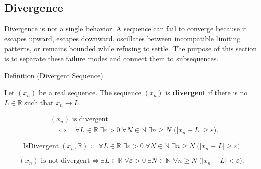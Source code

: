 \subsection*{Divergence}
\begin{exposition}
Divergence is not a single behavior. A sequence can fail to converge because
it escapes upward, escapes downward, oscillates between incompatible limiting
patterns, or remains bounded while refusing to settle. The purpose of this
section is to separate these failure modes and connect them to subsequences.
\end{exposition}


\begin{definitionbox}{Definition (Divergent Sequence)}
\begin{definition}
\label{def:divergent-sequence}
Let $(x_n)$ be a real sequence. The sequence $(x_n)$ is
\textbf{divergent} if there is no $L\in\mathbb{R}$ such that
$x_n\to L$.
\end{definition}
\end{definitionbox}

\begin{remark*}
\[
\begin{aligned}
&(x_n)\text{ is divergent}\\
&\quad\Longleftrightarrow\quad
\forall L\in\mathbb{R}\;\exists \varepsilon>0\;\forall N\in\mathbb{N}
\;\exists n\ge N\;\bigl(|x_n-L|\ge\varepsilon\bigr).
\end{aligned}
\]
\end{remark*}

\begin{remark*}
\[
\operatorname{IsDivergent}(x_n,\mathbb{R})
\coloneqq
\forall L\in\mathbb{R}\;\exists \varepsilon>0\;\forall N\in\mathbb{N}
\;\exists n\ge N\;\bigl(|x_n-L|\ge\varepsilon\bigr).
\]
\end{remark*}

\begin{remark*}
\[
(x_n)\text{ is not divergent}
\Longleftrightarrow
\exists L\in\mathbb{R}\;\forall \varepsilon>0\;\exists N\in\mathbb{N}
\;\forall n\ge N\;\bigl(|x_n-L|<\varepsilon\bigr).
\]
\end{remark*}

